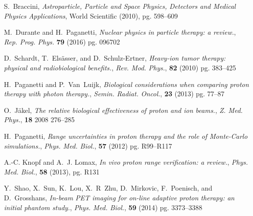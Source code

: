 \documentclass[a4paper,11pt]{article}
\begin{document}
\begin{thebibliography}{99}






S.~Braccini, \emph{Astroparticle, Particle and Space Physics, Detectors and
  Medical Physics Applications}, World Scientific (2010), pg. 598--609

M.~Durante and H.~Paganetti,  \emph{Nuclear physics in particle therapy: a review.}, \emph{Rep. Prog. Phys.} \textbf{79} (2016) pg. 096702

D.~Schardt, T.~Els\"asser, and D.~Schulz-Ertner, \emph{Heavy-ion tumor therapy: physical and radiobiological benefits.}, \emph{Rev. Mod. Phys.}, \textbf{82} (2010) pg. 383--425

H.~Paganetti and P.~Van~Luijk, \emph{Biological considerations when comparing proton therapy with photon therapy.},  \emph{Semin. Radiat. Oncol.}, \textbf{23} (2013) pg. 77--87

O.~J\"akel, \emph{The relative biological effectiveness of proton and ion beams.}, \emph{Z. Med. Phys.}, \textbf{18} 2008 276--285

H.~Paganetti, \emph{Range uncertainties in proton therapy and the role of {M}onte-{C}arlo simulations.}, \emph{Phys. Med. Biol.}, \textbf{57} (2012) pg. R99--R117

A.-C. Knopf and A.~J. Lomax, \emph{In vivo proton range verification: a review.}, \emph{Phys. Med. Biol.}, \textbf{58} (2013), pg. R131

Y.~Shao, X.~Sun, K.~Lou, X.~R~Zhu, D.~Mirkovic, F.~Poenisch, and D.~Grosshans, \emph{In-beam {PET} imaging for on-line adaptive proton therapy: an initial phantom study.}, \emph{Phys. Med. Biol.}, \textbf{59} (2014) pg. 3373--3388


\end{thebibliography}
\end{document}
